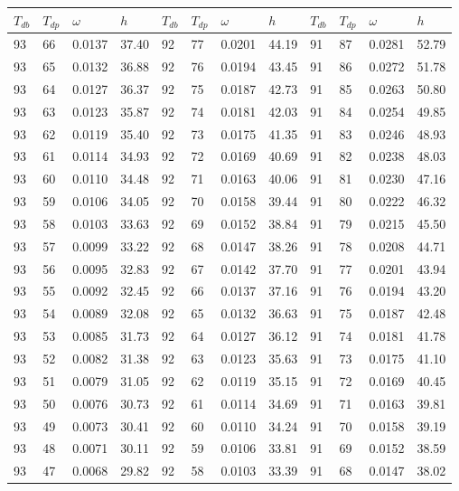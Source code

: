 \begin{tabular}{llll|llll|llll}
 \toprule 
\(T_{db}\) & \(T_{dp}\) & \(\omega\) & \(h\) & \(T_{db}\) & \(T_{dp}\) & \(\omega\) & \(h\) & \(T_{db}\) & \(T_{dp}\) & \(\omega\) & \(h\)  \\ \midrule 
93 & 66 & 0.0137 & 37.40 & 92 & 77 & 0.0201 & 44.19 & 91 & 87 & 0.0281 & 52.79\\
93 & 65 & 0.0132 & 36.88 & 92 & 76 & 0.0194 & 43.45 & 91 & 86 & 0.0272 & 51.78\\
93 & 64 & 0.0127 & 36.37 & 92 & 75 & 0.0187 & 42.73 & 91 & 85 & 0.0263 & 50.80\\
93 & 63 & 0.0123 & 35.87 & 92 & 74 & 0.0181 & 42.03 & 91 & 84 & 0.0254 & 49.85\\
93 & 62 & 0.0119 & 35.40 & 92 & 73 & 0.0175 & 41.35 & 91 & 83 & 0.0246 & 48.93\\
93 & 61 & 0.0114 & 34.93 & 92 & 72 & 0.0169 & 40.69 & 91 & 82 & 0.0238 & 48.03\\
93 & 60 & 0.0110 & 34.48 & 92 & 71 & 0.0163 & 40.06 & 91 & 81 & 0.0230 & 47.16\\
93 & 59 & 0.0106 & 34.05 & 92 & 70 & 0.0158 & 39.44 & 91 & 80 & 0.0222 & 46.32\\
93 & 58 & 0.0103 & 33.63 & 92 & 69 & 0.0152 & 38.84 & 91 & 79 & 0.0215 & 45.50\\
93 & 57 & 0.0099 & 33.22 & 92 & 68 & 0.0147 & 38.26 & 91 & 78 & 0.0208 & 44.71\\
93 & 56 & 0.0095 & 32.83 & 92 & 67 & 0.0142 & 37.70 & 91 & 77 & 0.0201 & 43.94\\
93 & 55 & 0.0092 & 32.45 & 92 & 66 & 0.0137 & 37.16 & 91 & 76 & 0.0194 & 43.20\\
93 & 54 & 0.0089 & 32.08 & 92 & 65 & 0.0132 & 36.63 & 91 & 75 & 0.0187 & 42.48\\
93 & 53 & 0.0085 & 31.73 & 92 & 64 & 0.0127 & 36.12 & 91 & 74 & 0.0181 & 41.78\\
93 & 52 & 0.0082 & 31.38 & 92 & 63 & 0.0123 & 35.63 & 91 & 73 & 0.0175 & 41.10\\
93 & 51 & 0.0079 & 31.05 & 92 & 62 & 0.0119 & 35.15 & 91 & 72 & 0.0169 & 40.45\\
93 & 50 & 0.0076 & 30.73 & 92 & 61 & 0.0114 & 34.69 & 91 & 71 & 0.0163 & 39.81\\
93 & 49 & 0.0073 & 30.41 & 92 & 60 & 0.0110 & 34.24 & 91 & 70 & 0.0158 & 39.19\\
93 & 48 & 0.0071 & 30.11 & 92 & 59 & 0.0106 & 33.81 & 91 & 69 & 0.0152 & 38.59\\
93 & 47 & 0.0068 & 29.82 & 92 & 58 & 0.0103 & 33.39 & 91 & 68 & 0.0147 & 38.02\\

\end{tabular}

